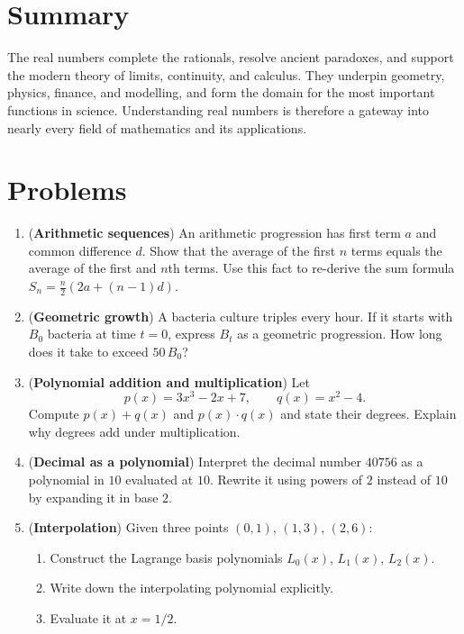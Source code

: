 \section*{Summary}

The real numbers complete the rationals, resolve ancient paradoxes, and support the modern theory of limits, continuity, and calculus. They underpin geometry, physics, finance, and modelling, and form the domain for the most important functions in science. Understanding real numbers is therefore a gateway into nearly every field of mathematics and its applications.

\section*{Problems}

\begin{enumerate}

\item (\textbf{Arithmetic sequences})
An arithmetic progression has first term $a$ and common difference $d$.
Show that the average of the first $n$ terms equals the average of the first and $n$th terms.
Use this fact to re-derive the sum formula $S_n = \frac{n}{2}(2a + (n-1)d)$.

\item (\textbf{Geometric growth})
A bacteria culture triples every hour.
If it starts with $B_0$ bacteria at time $t=0$, express $B_t$ as a geometric progression.
How long does it take to exceed $50\,B_0$?

\item (\textbf{Polynomial addition and multiplication})
Let 
\[
p(x)=3x^3-2x+7,\qquad q(x)=x^2-4.
\]
Compute $p(x)+q(x)$ and $p(x)\cdot q(x)$ and state their degrees.
Explain why degrees add under multiplication.

\item (\textbf{Decimal as a polynomial})
Interpret the decimal number $40756$ as a polynomial in $10$
evaluated at $10$.  
Rewrite it using powers of $2$ instead of $10$ by expanding it in base $2$.

\item (\textbf{Interpolation})
Given three points $(0,1)$, $(1,3)$, $(2,6)$:
\begin{enumerate}
    \item Construct the Lagrange basis polynomials $L_0(x)$, $L_1(x)$, $L_2(x)$.
    \item Write down the interpolating polynomial explicitly.
    \item Evaluate it at $x = 1/2$.
\end{enumerate}


\end{enumerate}
